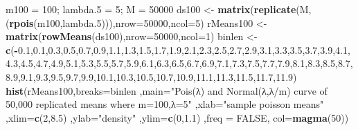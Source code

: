 \documentclass[
]{article}
\newenvironment{Shaded}{\begin{snugshade}}{\end{snugshade}}
\newcommand{\DataTypeTok}[1]{\textcolor[rgb]{0.13,0.29,0.53}{#1}}
\newcommand{\DecValTok}[1]{\textcolor[rgb]{0.00,0.00,0.81}{#1}}
\newcommand{\FloatTok}[1]{\textcolor[rgb]{0.00,0.00,0.81}{#1}}
\newcommand{\KeywordTok}[1]{\textcolor[rgb]{0.13,0.29,0.53}{\textbf{#1}}}
\newcommand{\NormalTok}[1]{#1}
\newcommand{\OperatorTok}[1]{\textcolor[rgb]{0.81,0.36,0.00}{\textbf{#1}}}
\newcommand{\OtherTok}[1]{\textcolor[rgb]{0.56,0.35,0.01}{#1}}
\newcommand{\StringTok}[1]{\textcolor[rgb]{0.31,0.60,0.02}{#1}}
\begin{document}
\begin{Shaded}
\begin{Highlighting}[]
\NormalTok{m100 =}\StringTok{ }\DecValTok{100}\NormalTok{; lambda}\FloatTok{.5}\NormalTok{ =}\StringTok{ }\DecValTok{5}\NormalTok{; M =}\StringTok{ }\DecValTok{50000}
\NormalTok{ds100 <-}\StringTok{ }\KeywordTok{matrix}\NormalTok{(}\KeywordTok{replicate}\NormalTok{(M,(}\KeywordTok{rpois}\NormalTok{(m100,lambda}\FloatTok{.5}\NormalTok{))),}\DataTypeTok{nrow=}\DecValTok{50000}\NormalTok{,}\DataTypeTok{ncol=}\DecValTok{5}\NormalTok{)}
\NormalTok{rMeans100 <-}\StringTok{ }\KeywordTok{matrix}\NormalTok{(}\KeywordTok{rowMeans}\NormalTok{(ds100),}\DataTypeTok{nrow=}\DecValTok{50000}\NormalTok{,}\DataTypeTok{ncol=}\DecValTok{1}\NormalTok{)}
\NormalTok{binlen <-}\StringTok{ }\KeywordTok{c}\NormalTok{(}\OperatorTok{-}\FloatTok{0.1}\NormalTok{,}\FloatTok{0.1}\NormalTok{,}\FloatTok{0.3}\NormalTok{,}\FloatTok{0.5}\NormalTok{,}\FloatTok{0.7}\NormalTok{,}\FloatTok{0.9}\NormalTok{,}\FloatTok{1.1}\NormalTok{,}\FloatTok{1.3}\NormalTok{,}\FloatTok{1.5}\NormalTok{,}\FloatTok{1.7}\NormalTok{,}\FloatTok{1.9}\NormalTok{,}\FloatTok{2.1}\NormalTok{,}\FloatTok{2.3}\NormalTok{,}\FloatTok{2.5}\NormalTok{,}\FloatTok{2.7}\NormalTok{,}\FloatTok{2.9}\NormalTok{,}\FloatTok{3.1}\NormalTok{,}\FloatTok{3.3}\NormalTok{,}\FloatTok{3.5}\NormalTok{,}\FloatTok{3.7}\NormalTok{,}\FloatTok{3.9}\NormalTok{,}\FloatTok{4.1}\NormalTok{,}\FloatTok{4.3}\NormalTok{,}\FloatTok{4.5}\NormalTok{,}\FloatTok{4.7}\NormalTok{,}\FloatTok{4.9}\NormalTok{,}\FloatTok{5.1}\NormalTok{,}\FloatTok{5.3}\NormalTok{,}\FloatTok{5.5}\NormalTok{,}\FloatTok{5.7}\NormalTok{,}\FloatTok{5.9}\NormalTok{,}\FloatTok{6.1}\NormalTok{,}\FloatTok{6.3}\NormalTok{,}\FloatTok{6.5}\NormalTok{,}\FloatTok{6.7}\NormalTok{,}\FloatTok{6.9}\NormalTok{,}\FloatTok{7.1}\NormalTok{,}\FloatTok{7.3}\NormalTok{,}\FloatTok{7.5}\NormalTok{,}\FloatTok{7.7}\NormalTok{,}\FloatTok{7.9}\NormalTok{,}\FloatTok{8.1}\NormalTok{,}\FloatTok{8.3}\NormalTok{,}\FloatTok{8.5}\NormalTok{,}\FloatTok{8.7}\NormalTok{,}\FloatTok{8.9}\NormalTok{,}\FloatTok{9.1}\NormalTok{,}\FloatTok{9.3}\NormalTok{,}\FloatTok{9.5}\NormalTok{,}\FloatTok{9.7}\NormalTok{,}\FloatTok{9.9}\NormalTok{,}\FloatTok{10.1}\NormalTok{,}\FloatTok{10.3}\NormalTok{,}\FloatTok{10.5}\NormalTok{,}\FloatTok{10.7}\NormalTok{,}\FloatTok{10.9}\NormalTok{,}\FloatTok{11.1}\NormalTok{,}\FloatTok{11.3}\NormalTok{,}\FloatTok{11.5}\NormalTok{,}\FloatTok{11.7}\NormalTok{,}\FloatTok{11.9}\NormalTok{)}
\KeywordTok{hist}\NormalTok{(rMeans100,}\DataTypeTok{breaks=}\NormalTok{binlen ,}\DataTypeTok{main=}\StringTok{"Pois(λ) and Normal(λ,λ/m) curve of 50,000 replicated means where m=100,λ=5"}\NormalTok{ ,}\DataTypeTok{xlab=}\StringTok{"sample poisson means"}\NormalTok{ ,}\DataTypeTok{xlim=}\KeywordTok{c}\NormalTok{(}\DecValTok{2}\NormalTok{,}\FloatTok{8.5}\NormalTok{) ,}\DataTypeTok{ylab=}\StringTok{"density"}\NormalTok{ ,}\DataTypeTok{ylim=}\KeywordTok{c}\NormalTok{(}\DecValTok{0}\NormalTok{,}\FloatTok{1.1}\NormalTok{) ,}\DataTypeTok{freq =} \OtherTok{FALSE}\NormalTok{, }\DataTypeTok{col=}\KeywordTok{magma}\NormalTok{(}\DecValTok{50}\NormalTok{))}

\end{Highlighting}
\end{Shaded}
\end{document}
